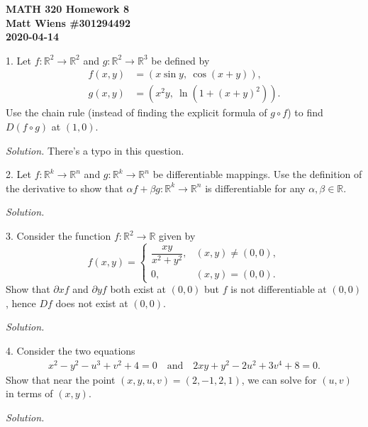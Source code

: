 \documentclass{article}
\newcommand{\R}{\mathbb{R}}
\begin{document}
\textbf{MATH 320 Homework 8} \\
\textbf{Matt Wiens \#301294492} \\
\textbf{2020-04-14}

1. Let $f: \R^2 \to \R^2$ and $g: \R^2 \to \R^3$ be defined by
%
\begin{align*}
    f(x, y) &= (x \sin y, \ \cos(x+y)), \\
    g(x, y) &= (x^2 y, \ \ln (1+(x+y)^2))
    .
\end{align*}
%
Use the chain rule (instead of finding the explicit formula of $g \circ
f$) to find $D(f \circ g)$ at $(1, 0)$.

\textit{Solution.}
There's a typo in this question.

\newpage

2. Let $f: \R^k \to \R^n$ and $g: \R^k \to \R^n$ be differentiable
mappings. Use the definition of the derivative to show that $\alpha f
+ \beta g: \R^k \to \R^n$ is differentiable for any $\alpha, \beta
\in \R$.

\textit{Solution.}

\newpage

3. Consider the function $f: \R^2 \to \R$ given by
%
\begin{equation*}
    f(x, y)
    = \begin{cases}
        \dfrac{x y}{x^2 + y^2}, & (x, y) \neq (0, 0), \\
        0, & (x, y) = (0, 0).
   \end{cases}
\end{equation*}
%
Show that $\partial x f$ and $\partial y f$ both exist at $(0, 0)$ but
$f$ is not differentiable at $(0, 0)$, hence $D f$ does not exist at
$(0, 0)$.

\textit{Solution.}

\newpage

4. Consider the two equations
%
\begin{align*}
    x^2 - y^2 - u^3 + v^2 + 4 = 0
    \quad \text{and} \quad
    2 x y + y^2 - 2 u^2 + 3 v^4 + 8 = 0
    .
\end{align*}
%
Show that near the point $(x, y, u, v) = (2, -1, 2, 1)$, we can solve
for $(u, v)$ in terms of $(x, y)$.

\textit{Solution.}
\end{document}
